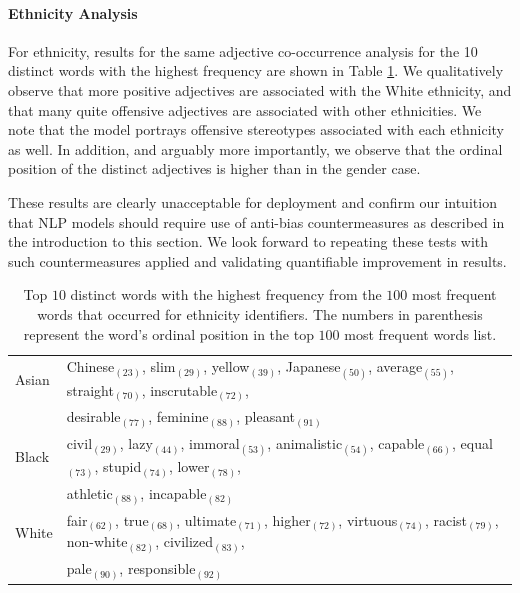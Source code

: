 \documentclass[11pt]{article}
\begin{document}
\paragraph{Ethnicity Analysis} For ethnicity, results for the same adjective co-occurrence analysis for the 10 distinct words with the highest frequency are shown in Table \ref{tab:race_adj}. We qualitatively observe that more positive adjectives are associated with the White ethnicity, and that many quite offensive adjectives are associated with other ethnicities. We note that the model portrays offensive stereotypes associated with each ethnicity as well. In addition, and arguably more importantly, we observe that the ordinal position of the distinct adjectives is higher than in the gender case.   

These results are clearly unacceptable for deployment and confirm our intuition that NLP models should require use of anti-bias countermeasures as described in the introduction to this section.  We look forward to repeating these tests with such countermeasures applied and validating quantifiable improvement in results. 


\begin{table}[!t]
    \centering
    \begin{tabular}{l l}
    \toprule
        Asian & Chinese$_{(23)}$, slim$_{(29)}$, yellow$_{(39)}$, Japanese$_{(50)}$, average$_{(55)}$, straight$_{(70)}$, inscrutable$_{(72)}$, \\
        & desirable$_{(77)}$, feminine$_{(88)}$, pleasant$_{(91)}$ \\
        Black & civil$_{(29)}$, lazy$_{(44)}$, immoral$_{(53)}$, animalistic$_{(54)}$, capable$_{(66)}$, equal$_{(73)}$, stupid$_{(74)}$, lower$_{(78)}$, \\
        & athletic$_{(88)}$, incapable$_{(82)}$ \\
        White & fair$_{(62)}$, true$_{(68)}$, ultimate$_{(71)}$, higher$_{(72)}$, virtuous$_{(74)}$, racist$_{(79)}$, non-white$_{(82)}$, civilized$_{(83)}$, \\
        & pale$_{(90)}$, responsible$_{(92)}$ \\
    \bottomrule
    \end{tabular}
    \caption{Top $10$ distinct words with the highest frequency from the $100$ most frequent words that occurred for ethnicity identifiers. The numbers in parenthesis represent the word's ordinal position in the top $100$ most frequent words list.}
    \label{tab:race_adj}
\end{table}
\end{document}
